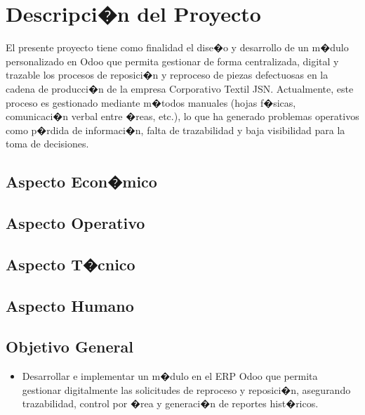 \documentclass[12pt,letterpaper,spanish, xcolor=table]{report}
\begin{document}
\section{Descripci�n del Proyecto}

El presente proyecto tiene como finalidad el dise�o y desarrollo de un m�dulo personalizado en Odoo que permita gestionar de forma centralizada, digital y trazable los procesos de reposici�n y reproceso de piezas defectuosas en la cadena de producci�n de la empresa Corporativo Textil JSN. Actualmente, este proceso es gestionado mediante m�todos manuales (hojas f�sicas, comunicaci�n verbal entre �reas, etc.), lo que ha generado problemas operativos como p�rdida de informaci�n, falta de trazabilidad y baja visibilidad para la toma de decisiones.

\subsection*{Aspecto Econ�mico}


\subsection*{Aspecto Operativo}


\subsection*{Aspecto T�cnico}


\subsection*{Aspecto Humano}



\subsection{Objetivo General}
\begin{itemize}
\item Desarrollar e implementar un m�dulo en el ERP Odoo que permita gestionar digitalmente las solicitudes de reproceso y reposici�n, asegurando trazabilidad, control por �rea y generaci�n de reportes hist�ricos.
\end{itemize}
\end{document}
